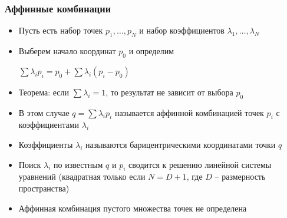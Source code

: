 \documentclass{beamer}
\begin{document}
\begin{frame}[fragile]
\frametitle{Аффинные комбинации}
\begin{itemize}
\item Пусть есть набор точек \begin{math}p_1, \dots, p_N\end{math} и набор коэффициентов \begin{math}\lambda_1, \dots, \lambda_N\end{math}
\pause
\item Выберем начало координат \begin{math}p_0\end{math} и определим

\begin{math}\sum \lambda_i p_i = p_0 + \sum \lambda_i (p_i - p_0) \end{math}
\pause
\item Теорема: если \begin{math}\sum \lambda_i = 1\end{math}, то результат не зависит от выбора \begin{math}p_0\end{math}
\pause
\item В этом случае \begin{math}q = \sum \lambda_i p_i\end{math} называется аффинной комбинацией точек \begin{math}p_i\end{math} с коэффициентами \begin{math}\lambda_i\end{math}
\pause
\item Коэффициенты \begin{math}\lambda_i\end{math} называются барицентрическими координатами точки \begin{math}q\end{math}
\pause
\item Поиск \begin{math}\lambda_i\end{math} по известным \begin{math}q\end{math} и \begin{math}p_i\end{math} сводится к решению линейной системы уравнений (квадратная только если \begin{math}N = D + 1\end{math}, где \begin{math}D\end{math} -- размерность пространства)
\pause
\item Аффинная комбинация пустого множества точек не определена
\end{itemize}
\end{frame}
\end{document}
